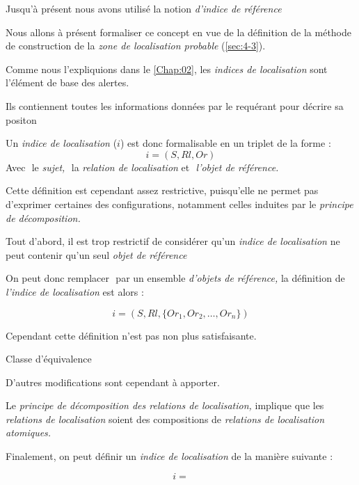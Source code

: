 
Jusqu'à présent nous avons utilisé la notion \emph{d'indice de
  référence}

Nous allons à présent formaliser ce concept en vue de la définition de
la méthode de construction de la \emph{zone de localisation probable}
(\autoref{sec:4-3}).

Comme nous l'expliquions dans le \autoref{Chap:02}, les \emph{indices
  de localisation} sont l'élément de base des alertes.

Ils contiennent toutes les informations données par le requérant pour
décrire sa positon

Un \emph{indice de localisation} (\(i\)) est donc formalisable en un
triplet de la forme :
%
\begin{equation}
  i = (S, Rl, Or)
\end{equation}
%
Avec \(\) le \emph{sujet,} \(\) la \emph{relation de localisation} et
\(\) \emph{l'objet de référence.}

Cette définition est cependant assez restrictive, puisqu'elle ne
permet pas d'exprimer certaines des configurations, notamment celles
induites par le \emph{principe de décomposition.}

Tout d'abord, il est trop restrictif de considérer qu'un \emph{indice
  de localisation} ne peut contenir qu'un seul \emph{objet de
  référence}

On peut donc remplacer \(\) par un ensemble \emph{d'objets de
  référence,} la définition de \emph{l'indice de localisation} est
alors :

\begin{equation}
  i = (S, Rl, \{Or_1, Or_2, \ldots, Or_n\})
\end{equation}

Cependant cette définition n'est pas non plus satisfaisante.

Classe d'équivalence


D'autres modifications sont cependant à apporter.

Le \emph{principe de décomposition des relations de localisation,}
implique que les \emph{relations de localisation} soient des
compositions de \emph{relations de localisation atomiques.}



Finalement, on peut définir un \emph{indice de localisation} de la
manière suivante :

\begin{equation}
  i =
\end{equation}

